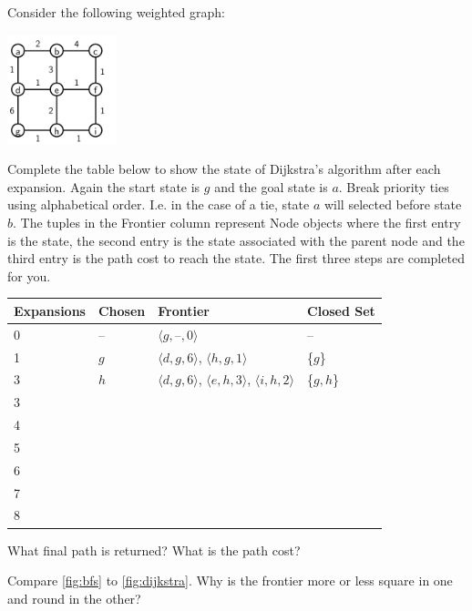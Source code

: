 \begin{exercise}
  \label{ex:dij_table}
  Consider the following weighted graph:

  \includegraphics[width=1.25in]{planning/figs/exercises/hw_graph.pdf}
  
  Complete the table below to show the state of Dijkstra's algorithm
  after each expansion.  Again the start state is $g$ and the goal
  state is $a$.  Break priority ties using alphabetical order.
  I.e. in the case of a tie, state $a$ will selected before state
  $b$. The tuples in the Frontier column represent Node objects where
  the first entry is the state, the second entry is the state
  associated with the parent node and the third entry is the path cost
  to reach the state. The first three steps are completed for you.

  \begin{center}
\begin{tabular}{|l|l|p{3in}|p{1in}|}
  \hline
  Expansions & Chosen  & Frontier & Closed Set \\
  \hline
  0 & -- & $\langle g, \text{--}, 0 \rangle$& --\\
  \hline
  1&$g$& $\langle d, g , 6\rangle$, $\langle h, g, 1 \rangle$& \{$g$\}\\
  \hline
    3& $h$ & $\langle d, g, 6 \rangle$,  $\langle e, h, 3 \rangle$, $\langle i, h, 2 \rangle$  & \{$g, h$\} \\
    \hline
    3&&&\\
    \hline
    4&&&\\
    \hline
    5&&&\\
    \hline
    6&&&\\
    \hline
    7&&&\\
    \hline
    8&&&\\
    \hline
\end{tabular}
\end{center}

  What final path is returned?  What is the path cost?
\end{exercise}

\begin{exercise}
  Compare \ref{fig:bfs} to \ref{fig:dijkstra}.  Why is the
  frontier more or less square in one and round in the other?
\end{exercise}

